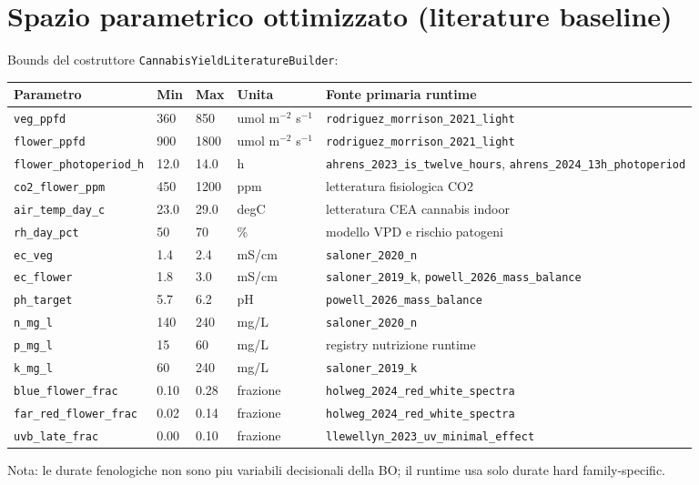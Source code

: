 ﻿\documentclass[11pt,a4paper]{report}
\begin{document}
\section{Spazio parametrico ottimizzato (literature baseline)}
Bounds del costruttore \texttt{CannabisYieldLiteratureBuilder}:
\begin{longtable}{@{}p{3.4cm}p{1.2cm}p{1.2cm}p{2.0cm}p{5.0cm}@{}}
\toprule
Parametro & Min & Max & Unita & Fonte primaria runtime \\ \midrule
\texttt{veg\_ppfd} & 360 & 850 & umol m$^{-2}$ s$^{-1}$ & \texttt{rodriguez\_morrison\_2021\_light} \\
\texttt{flower\_ppfd} & 900 & 1800 & umol m$^{-2}$ s$^{-1}$ & \texttt{rodriguez\_morrison\_2021\_light} \\
\texttt{flower\_photoperiod\_h} & 12.0 & 14.0 & h & \texttt{ahrens\_2023\_is\_twelve\_hours}, \texttt{ahrens\_2024\_13h\_photoperiod} \\
\texttt{co2\_flower\_ppm} & 450 & 1200 & ppm & letteratura fisiologica CO2 \\
\texttt{air\_temp\_day\_c} & 23.0 & 29.0 & degC & letteratura CEA cannabis indoor \\
\texttt{rh\_day\_pct} & 50 & 70 & \% & modello VPD e rischio patogeni \\
\texttt{ec\_veg} & 1.4 & 2.4 & mS/cm & \texttt{saloner\_2020\_n} \\
\texttt{ec\_flower} & 1.8 & 3.0 & mS/cm & \texttt{saloner\_2019\_k}, \texttt{powell\_2026\_mass\_balance} \\
\texttt{ph\_target} & 5.7 & 6.2 & pH & \texttt{powell\_2026\_mass\_balance} \\
\texttt{n\_mg\_l} & 140 & 240 & mg/L & \texttt{saloner\_2020\_n} \\
\texttt{p\_mg\_l} & 15 & 60 & mg/L & registry nutrizione runtime \\
\texttt{k\_mg\_l} & 60 & 240 & mg/L & \texttt{saloner\_2019\_k} \\
\texttt{blue\_flower\_frac} & 0.10 & 0.28 & frazione & \texttt{holweg\_2024\_red\_white\_spectra} \\
\texttt{far\_red\_flower\_frac} & 0.02 & 0.14 & frazione & \texttt{holweg\_2024\_red\_white\_spectra} \\
\texttt{uvb\_late\_frac} & 0.00 & 0.10 & frazione & \texttt{llewellyn\_2023\_uv\_minimal\_effect} \\
\bottomrule
\end{longtable}
Nota: le durate fenologiche non sono piu variabili decisionali della BO; il runtime usa solo durate hard family-specific.
\end{document}
